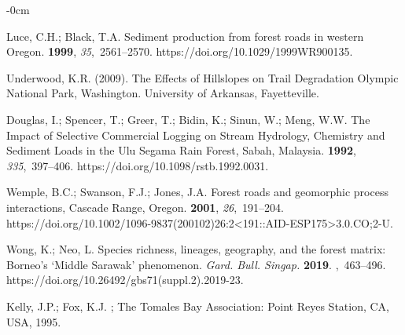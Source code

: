 \documentclass[remotesensing,article,accept,pdftex,moreauthors]{Definitions/mdpi}
\begin{document}
\begin{adjustwidth}{-\extralength}{0cm}
\begin{thebibliography}{999}
Luce, %
 C.H.; Black, T.A.
\newblock Sediment production from forest roads in western Oregon.
 {\bf 1999}, {\em 35},~2561--2570. https://doi.org/10.1029/1999WR900135.

Underwood, K.R.
\newblock (2009). The Effects of Hillslopes on Trail Degradation Olympic National Park, Washington. University of Arkansas, Fayetteville. %


Douglas, I.; Spencer, T.; Greer, T.; Bidin, K.; Sinun, W.; Meng, W.W.
\newblock The Impact of Selective Commercial Logging on Stream Hydrology,
  Chemistry and Sediment Loads in the Ulu Segama Rain Forest, Sabah, Malaysia.
 {\bf 1992},
  {\em 335},~397--406. https://doi.org/10.1098/rstb.1992.0031.

Wemple, B.C.; Swanson, F.J.; Jones, J.A.
\newblock Forest roads and geomorphic process interactions, Cascade Range,
  Oregon.
 {\bf 2001}, {\em
  26},~191--204. https://doi.org/10.1002/1096-9837(200102)26:2<191::AID-ESP175>3.0.CO;2-U.

Wong, K.; Neo, L.
\newblock Species richness, lineages, geography, and the forest matrix:
  Borneo's `Middle Sarawak' phenomenon. {\em Gard. Bull. Singap.} {\bf 2019}.
,~463--496.
\newblock https://doi.org/10.26492/gbs71(suppl.2).2019-23.

Kelly, J.P.; Fox, K.J.
; The Tomales Bay Association: Point Reyes Station, CA, USA, %
 1995.


\end{thebibliography}
\end{adjustwidth}
\end{document}
